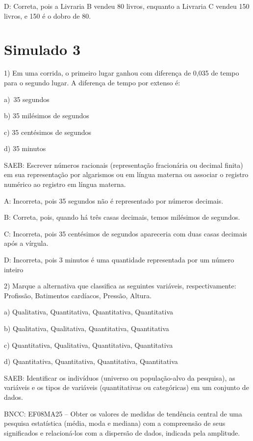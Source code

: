 D: Correta, pois a Livraria B vendeu 80 livros, enquanto a Livraria C
vendeu 150 livros, e 150 é o dobro de 80.

\hypertarget{simulado-3}{%
\section{Simulado 3}\label{simulado-3}}

1) Em uma corrida, o primeiro lugar ganhou com diferença de 0,035 de
tempo para o segundo lugar. A diferença de tempo por extenso é:

a)~35 segundos

b) 35 milésimos de segundos

c) 35 centésimos de segundos~

d) 35 minutos

SAEB: Escrever números racionais (representação fracionária ou decimal
finita) em sua representação por algarismos ou em língua materna ou
associar o registro numérico ao registro em língua materna.

A: Incorreta, pois 35 segundos não é representado por números decimais.

B: Correta, pois, quando há três casas decimais, temos milésimos de
segundos.

C: Incorreta, pois 35 centésimos de segundos apareceria com duas casas
decimais após a vírgula.

D: Incorreta, pois 3 minutos é uma quantidade representada por um número
inteiro

2) Marque a alternativa que classifica as seguintes variáveis,
respectivamente: Profissão, Batimentos cardíacos, Pressão, Altura.

a) Qualitativa, Quantitativa, Quantitativa, Quantitativa

b) Qualitativa, Qualitativa, Quantitativa, Quantitativa

c) Quantitativa, Qualitativa, Quantitativa, Quantitativa

d) Quantitativa, Quantitativa, Quantitativa, Quantitativa

SAEB: Identificar os indivíduos (universo ou população-alvo da
pesquisa), as variáveis e os tipos de variáveis (quantitativas ou
categóricas) em um conjunto de dados.

BNCC: EF08MA25 -- Obter os valores de medidas de tendência central de
uma pesquisa estatística (média, moda e mediana) com a compreensão de
seus significados e relacioná-los com a dispersão de dados, indicada
pela amplitude.

